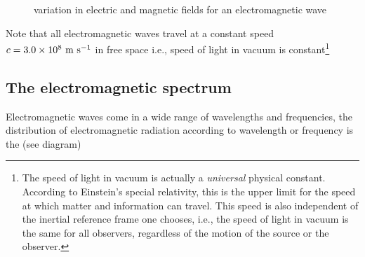 \begin{figure}[ht]
	\caption{variation in electric and magnetic fields for an electromagnetic wave}
\end{figure}

Note that all electromagnetic waves travel at a constant speed $c=3.0\times10^8\text{ m s$^{-1}$}$ in free space i.e., speed of light in vacuum is constant\footnote{The speed of light in vacuum is actually a \emph{universal} physical constant. According to Einstein's special relativity, this is the upper limit for the speed at which matter and information can travel. This speed is also independent of the inertial reference frame one chooses, i.e., the speed of light in vacuum is the same for all observers, regardless of the motion of the source or the observer.}


\newpage
\subsection{The electromagnetic spectrum}

Electromagnetic waves come in a wide range of wavelengths and frequencies, the distribution of electromagnetic radiation according to wavelength or frequency is the  (see diagram)



